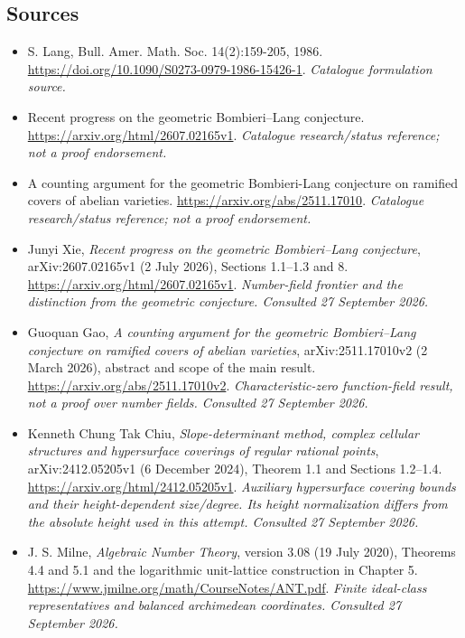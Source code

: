 \documentclass[11pt,a4paper]{article}
\numberwithin{equation}{section}
\begin{document}
\subsection{Sources}
\begin{itemize}\raggedright
\item[\textnormal{[S1]}]\hypertarget{source:55:1}{} S. Lang, Bull. Amer. Math. Soc. 14(2):159-205, 1986.
\url{https://doi.org/10.1090/S0273-0979-1986-15426-1}.
{\small\textit{Catalogue formulation source.}}
\item[\textnormal{[S2]}]\hypertarget{source:55:2}{} Recent progress on the geometric Bombieri–Lang conjecture.
\url{https://arxiv.org/html/2607.02165v1}.
{\small\textit{Catalogue research/status reference; not a proof endorsement.}}
\item[\textnormal{[S3]}]\hypertarget{source:55:3}{} A counting argument for the geometric Bombieri-Lang conjecture on ramified covers of abelian varieties.
\url{https://arxiv.org/abs/2511.17010}.
{\small\textit{Catalogue research/status reference; not a proof endorsement.}}

\item[\textnormal{[E1]}]\hypertarget{extra:55:1}{} Junyi Xie, \emph{Recent progress on the geometric Bombieri--Lang conjecture}, arXiv:2607.02165v1 (2 July 2026), Sections 1.1--1.3 and 8.
\url{https://arxiv.org/html/2607.02165v1}.
{\small\textit{Number-field frontier and the distinction from the geometric conjecture. Consulted 27 September 2026.}}
\item[\textnormal{[E2]}]\hypertarget{extra:55:2}{} Guoquan Gao, \emph{A counting argument for the geometric Bombieri--Lang conjecture on ramified covers of abelian varieties}, arXiv:2511.17010v2 (2 March 2026), abstract and scope of the main result.
\url{https://arxiv.org/abs/2511.17010v2}.
{\small\textit{Characteristic-zero function-field result, not a proof over number fields. Consulted 27 September 2026.}}
\item[\textnormal{[E3]}]\hypertarget{extra:55:3}{} Kenneth Chung Tak Chiu, \emph{Slope-determinant method, complex cellular structures and hypersurface coverings of regular rational points}, arXiv:2412.05205v1 (6 December 2024), Theorem 1.1 and Sections 1.2--1.4.
\url{https://arxiv.org/html/2412.05205v1}.
{\small\textit{Auxiliary hypersurface covering bounds and their height-dependent size/degree. Its height normalization differs from the absolute height used in this attempt. Consulted 27 September 2026.}}
\item[\textnormal{[E4]}]\hypertarget{extra:55:4}{} J. S. Milne, \emph{Algebraic Number Theory}, version 3.08 (19 July 2020), Theorems 4.4 and 5.1 and the logarithmic unit-lattice construction in Chapter 5.
\url{https://www.jmilne.org/math/CourseNotes/ANT.pdf}.
{\small\textit{Finite ideal-class representatives and balanced archimedean coordinates. Consulted 27 September 2026.}}
\end{itemize}
\end{document}
